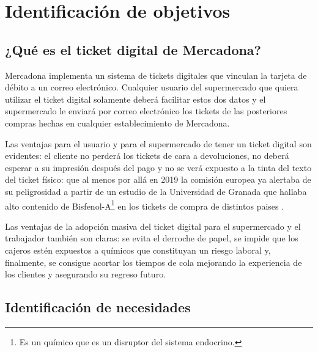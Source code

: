 \documentclass[a4paper,12pt]{report}
\begin{document}
	
	
	
	
	
	
	
	\begingroup
	\setlength{\parskip}{.7em}
	
	
	
	
	\chapter{Identificación de objetivos}

		\section{¿Qué es el ticket digital de Mercadona?}
		
		Mercadona implementa un sistema de tickets digitales que vinculan la tarjeta de débito a un correo electrónico. Cualquier usuario del supermercado que quiera utilizar el ticket digital solamente deberá facilitar estos dos datos y el supermercado le enviará por correo electrónico los tickets de las posteriores compras hechas en cualquier establecimiento de Mercadona.
		
		Las ventajas para el usuario y para el supermercado de tener un ticket digital son evidentes: el cliente no perderá los tickets de cara a devoluciones, no deberá esperar a su impresión después del pago y no se verá expuesto a la tinta del texto del ticket físico: que al menos por allá en 2019 la comisión europea ya alertaba de su peligrosidad \cite{EU_Parliament_2019} a partir de un estudio de la Universidad de Granada que hallaba alto contenido de Bisfenol-A\footnote{Es un químico que es un disruptor del sistema endocrino.} en los tickets de compra de distintos paises \cite{Molina-Molina2019}\cite{CanalUGR}.
		
		Las ventajas de la adopción masiva del ticket digital para el supermercado y el trabajador también son claras: se evita el derroche de papel, se impide que los cajeros estén expuestos a químicos que constituyan un riesgo laboral y, finalmente, se consigue acortar los tiempos de cola mejorando la experiencia de los clientes y asegurando su regreso futuro.
		
		
		
		\section{Identificación de necesidades}
		\label{section:identificacionNecesidades}
		
\end{document}
